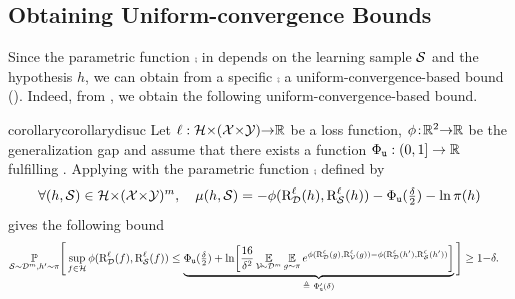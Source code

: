 \documentclass[twoside]{article}
\theoremstyle{plain}
\begin{document}
\subsection{Obtaining Uniform-convergence Bounds}
\label{sec:obtaining-uc}

Since the parametric function $\comp$ in  depends on the learning sample $\mathcal{S}$ and the hypothesis $h$, we can obtain from a specific $\comp$ a uniform-convergence-based bound ().
Indeed, from , we obtain the following uniform-convergence-based bound.

\begin{restatable}{corollary}{corollarydisuc} \label{corollary:dis-uc}
Let $\ell: \mathcal{H}{\times}(\mathcal{X}{\times}\mathcal{Y}){\to}\mathbb{R}$ be a loss function, $\phi\!:\! \mathbb{R}^2{\to}\mathbb{R}$ be the generalization gap and assume that there exists a function $\Phi_{{\tt u}}: (0,1]\to\mathbb{R}$ fulfilling .
Applying  with the parametric function $\comp$ defined by
\begin{align*}
    \forall (h,\mathcal{S})\in\mathcal{H}{\times}(\mathcal{X}{\times}\mathcal{Y})^m,\quad \operatorname{\mu}(h, \mathcal{S}) = -\phi(\text{R}^{\ell}_{\mathcal{D}}(h),\text{R}^{\ell}_{\mathcal{S}}(h))  -\Phi_{{\tt u}}(\tfrac{\delta}{2}) -\ln\pi(h)
\end{align*}
gives the following bound 
\begin{align}
    \PP_{\Scal\sim\Dcal^m, h'\sim\P}&\Bigg[ \sup_{f\in\Hcal}\phi(\RiskLoss_{\Dcal}(f),\RiskLoss_{\Scal}(f)) \le \underbrace{\PhiUC(\tfrac{\delta}{2}) + \ln\!\left[\frac{16}{\delta^2} \EE_{\Vcal\!{\sim}\Dcal^m}\EE_{g{\sim}\P} e^{\phi(\RiskLoss_{\Dcal}(g),\RiskLoss_{\Vcal}(g))-\phi(\RiskLoss_{\Dcal}(h'),\RiskLoss_{\Scal}(h'))}\right]}_{\defeq\ \PhiUC'(\delta)} \Bigg] \ge 1{-}\delta.
\end{align}
\end{restatable}
\end{document}
